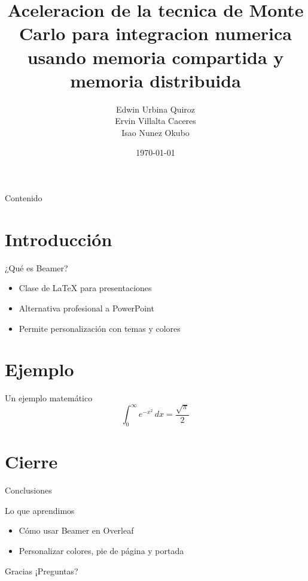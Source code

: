 \documentclass{beamer}
\title[Fisica Computacional]{Aceleracion de la tecnica de Monte Carlo para integracion numerica usando memoria compartida y memoria distribuida}
\author[]{Edwin Urbina Quiroz\\
Ervin Villalta Caceres\\
Isao Nunez Okubo
}
\institute{Universidad de Costa Rica}
\date{\today}
\begin{document}
\begin{frame}
  \titlepage
\end{frame}

\begin{frame}{Contenido}
  \tableofcontents
\end{frame}

\section{Introducción}

\begin{frame}{¿Qué es Beamer?}
  \begin{itemize}
    \item Clase de \LaTeX{} para presentaciones
    \item Alternativa profesional a PowerPoint
    \item Permite personalización con temas y colores
  \end{itemize}
\end{frame}

\section{Ejemplo}

\begin{frame}{Un ejemplo matemático}
  \[
    \int_0^\infty e^{-x^2}\, dx = \frac{\sqrt{\pi}}{2}
  \]
\end{frame}

\section{Cierre}

\begin{frame}{Conclusiones}
  \begin{block}{Lo que aprendimos}
    \begin{itemize}
      \item Cómo usar Beamer en Overleaf
      \item Personalizar colores, pie de página y portada
    \end{itemize}
  \end{block}
\end{frame}

\begin{frame}{Gracias}
  \centering
  ¡Preguntas?  
  \vfill
\end{frame}
\end{document}

